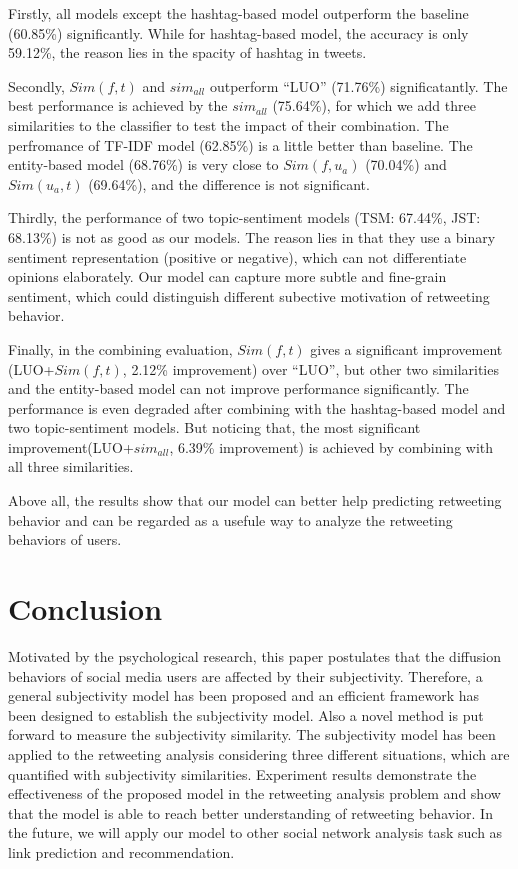 \documentclass[letterpaper]{article}
\begin{document}
Firstly, all models except the hashtag-based model outperform the baseline (60.85\%) significantly. While for hashtag-based model, the accuracy is only 59.12\%, the reason lies in the spacity of hashtag in tweets. 

Secondly, $ Sim(f,t) $ and $ sim_{all}  $ outperform ``LUO'' (71.76\%) significatantly.
The best performance is achieved by the $ sim_{all}  $ (75.64\%), for which we add three similarities to the classifier to test the impact of their combination. 
The perfromance of TF-IDF model (62.85\%) is a little better than baseline. 
The entity-based model (68.76\%) is very close to  $ Sim(f,u_a)$ (70.04\%) and $ Sim(u_a,t)  $ (69.64\%), and the difference is not significant.

Thirdly, the performance of two topic-sentiment models (TSM: 67.44\%, JST: 68.13\%) is not as good as our models. The reason lies in that they use a binary sentiment representation (positive or negative), which can not differentiate opinions elaborately. Our model can capture more subtle and fine-grain sentiment, which could distinguish different subective motivation of retweeting behavior.

Finally, in the combining evaluation, $ Sim(f,t) $ gives a significant improvement (LUO+$ Sim(f,t) $, 2.12\% improvement) over ``LUO'', but other two similarities and the entity-based model can not improve performance significantly. The performance is even degraded after combining with the hashtag-based model and two topic-sentiment models. 
But noticing that, the most significant improvement(LUO+$ sim_{all}  $, 6.39\% improvement) is achieved by combining with all three similarities. 

Above all, the results show that our model can better help predicting retweeting behavior and can be regarded as a usefule way to analyze the retweeting behaviors of users. 

\section{Conclusion}
Motivated by the psychological research, this paper postulates that the diffusion behaviors of social media users are affected by their subjectivity. Therefore, a general subjectivity model has been proposed and an efficient framework has been designed to establish the subjectivity model. Also a novel method is put forward to measure the subjectivity similarity. The subjectivity model has been applied to the retweeting analysis considering three different situations, which are quantified with subjectivity similarities. 
Experiment results demonstrate the effectiveness of the proposed model in the retweeting analysis problem and show that the model is able to reach better understanding of retweeting behavior. 
In the future, we will apply our model to other social network analysis task such as link prediction and recommendation. 



\end{document}
